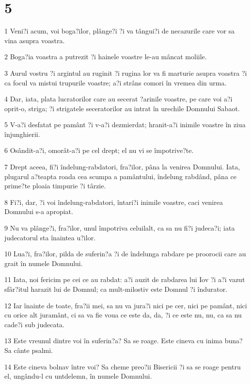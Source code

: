 \chapter{5}

\par 1 Veni?i acum, voi boga?ilor, plânge?i ?i va tângui?i de necazurile care vor sa vina asupra voastra.
\par 2 Boga?ia voastra a putrezit ?i hainele voastre le-au mâncat moliile.
\par 3 Aurul vostru ?i argintul au ruginit ?i rugina lor va fi marturie asupra voastra ?i ca focul va mistui trupurile voastre; a?i strâns comori în vremea din urma.
\par 4 Dar, iata, plata lucratorilor care au secerat ?arinile voastre, pe care voi a?i oprit-o, striga; ?i strigatele seceratorilor au intrat în urechile Domnului Sabaot.
\par 5 V-a?i desfatat pe pamânt ?i v-a?i dezmierdat; hranit-a?i inimile voastre în ziua înjunghierii.
\par 6 Osândit-a?i, omorât-a?i pe cel drept; el nu vi se împotrive?te.
\par 7 Drept aceea, fi?i îndelung-rabdatori, fra?ilor, pâna la venirea Domnului. Iata, plugarul a?teapta roada cea scumpa a pamântului, îndelung rabdând, pâna ce prime?te ploaia timpurie ?i târzie.
\par 8 Fi?i, dar, ?i voi îndelung-rabdatori, întari?i inimile voastre, caci venirea Domnului s-a apropiat.
\par 9 Nu va plânge?i, fra?ilor, unul împotriva celuilalt, ca sa nu fi?i judeca?i; iata judecatorul sta înaintea u?ilor.
\par 10 Lua?i, fra?ilor, pilda de suferin?a ?i de îndelunga rabdare pe proorocii care au grait în numele Domnului.
\par 11 Iata, noi fericim pe cei ce au rabdat: a?i auzit de rabdarea lui Iov ?i a?i vazut sfâr?itul harazit lui de Domnul; ca mult-milostiv este Domnul ?i îndurator.
\par 12 Iar înainte de toate, fra?ii mei, sa nu va jura?i nici pe cer, nici pe pamânt, nici cu orice alt juramânt, ci sa va fie voua ce este da, da, ?i ce este nu, nu, ca sa nu cade?i sub judecata.
\par 13 Este vreunul dintre voi în suferin?a? Sa se roage. Este cineva cu inima buna? Sa cânte psalmi.
\par 14 Este cineva bolnav între voi? Sa cheme preo?ii Bisericii ?i sa se roage pentru el, ungându-l cu untdelemn, în numele Domnului.
